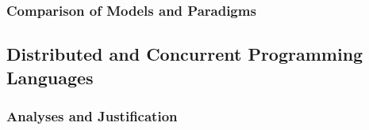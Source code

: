 \subsubsection{Comparison of Models and Paradigms}


\subsection{Distributed and Concurrent Programming Languages}


\subsubsection{Analyses and Justification}

\begin{comment}


The Shared-Nothing Architecture (SNA) is a design principle that ensures each component in a system operates independently, with no shared memory or storage. Communication is achieved through explicit message passing or synchronization mechanisms. This architecture underpins many modern distributed systems, including Hadoop and cloud-native applications.


The field of distributed computing emerged from foundational theories in concurrency and formal semantics, with early contributions emphasizing mathematical rigor in algorithm analysis, where it included \gls{CSP}, introduced by C.A.R. Hoare in 1978 \cite{Hoare1983}. The \gls{CSP}, on an abstract way, emphasized communication over channels, without shared state, as a structured approach to concurrency. This model greatly influenced later languages by promoting message-passing as an efficient means to handle concurrent processes, laying groundwork for modern distributed systems \cite{}. Occam it was a tentative of a pure \gls{CSP} implementation on the same year \cite{}.

Early research in distributed systems initially focused on methods to coordinate shared memory across distributed environments. One early approach was \gls{DSM}, which extends the concept of virtual memory by allowing virtual addresses on one machine to map to physical memory regions on remote machines without sharing physical memory \cite{Tanenbaum1988}. The Orca programming language, introduced in 1993, was an early example of implementing \gls{DSM} as a high-level abstraction for distributed computing.

The actor model emerged, in 1973 by Hewitt et al., proposing a model where independent entities (actors) communicate solely through message passing. This model proved valuable in building fault-tolerant distributed applications by isolating processes from one another, thus avoiding shared state issues \cite{Koster2016}. Languages like Emerald and later Erlang adopted the actor model, with Erlang particularly becoming a pioneer in fault-tolerant systems for telecommunications and distributed computing \cite{Valkov2018}.


\end{comment}
